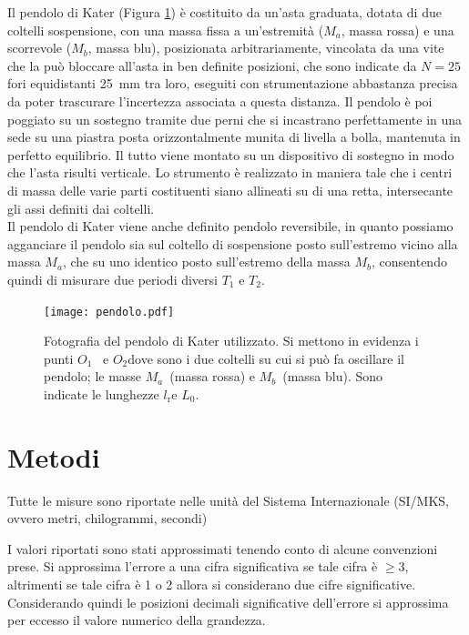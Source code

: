 \documentclass[italian, a4paper, 10pt, twocolumn]{../../style/lab_unige}
\newcommand{\reffig}[1]{Figura {\ref{#1}}}%
\newcommand{\Oi}{$O_1$}
\newcommand{\Oii}{$O_2$}
\newcommand{\lr}{$l_{\text{r}}$}
\newcommand{\Ti}[1]{$T_{#1}$}
\newcommand{\Ma}{$M_a$}
\newcommand{\Mb}{$M_b$}
\begin{document}
    Il pendolo di Kater (\reffig{figure:pendolo}) è costituito da un'asta graduata, dotata di due coltelli sospensione, con una massa fissa a un'estremità (\Ma, massa rossa) e una scorrevole (\Mb, massa blu), posizionata arbitrariamente, vincolata da una vite che la può bloccare all'asta in ben definite posizioni, che sono indicate da $N=25$ fori equidistanti 25~mm tra loro, eseguiti con strumentazione abbastanza precisa da poter trascurare l'incertezza associata a questa distanza. Il pendolo è poi poggiato su un sostegno tramite due perni che si incastrano perfettamente in una sede su una piastra posta orizzontalmente munita di livella a bolla, mantenuta in perfetto equilibrio. Il tutto viene montato su un dispositivo di sostegno in modo che l'asta risulti verticale. Lo strumento è realizzato in maniera tale che i centri di massa delle varie parti costituenti siano allineati su di una retta, intersecante gli assi definiti dai coltelli.\\
    Il pendolo di Kater viene anche definito pendolo reversibile, in quanto possiamo agganciare il pendolo sia sul coltello di sospensione posto sull'estremo vicino alla massa \Ma, che su uno identico posto sull'estremo della massa \Mb, consentendo quindi di misurare due periodi diversi \Ti{1} e \Ti{2}. 

    \begin{figure}[h!]
        \texttt{[image: pendolo.pdf]}
        \caption{Fotografia del pendolo di Kater utilizzato. Si mettono in evidenza i punti \Oi~ e \Oii dove sono i due coltelli su cui si può fa oscillare il pendolo; le masse \Ma~(massa rossa) e \Mb~(massa blu). Sono indicate le lunghezze \lr e $L_0$.}
        \label{figure:pendolo}
    \end{figure}

    \section{Metodi}
    \label{section:methods}
    Tutte le misure sono riportate nelle unità del Sistema Internazionale (SI/MKS, ovvero metri, chilogrammi, secondi)
    
    I valori riportati sono stati approssimati tenendo conto di alcune convenzioni prese. Si approssima l'errore a una cifra significativa se tale cifra è $\geqslant3$, altrimenti se tale cifra è 1 o 2 allora si considerano due cifre significative. Considerando quindi le posizioni decimali significative dell'errore si approssima per eccesso il valore numerico della grandezza.\\
\end{document}
